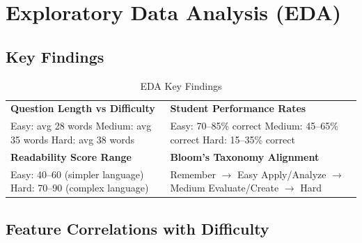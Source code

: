 \documentclass[12pt,a4paper]{article}
\begin{document}
\section{Exploratory Data Analysis (EDA)}

\subsection{Key Findings}

\begin{table}[H]
\centering
\begin{tabular}{|L{6cm}|L{6cm}|}
\hline
{}
 \\
\hline
\textcolor{nstlightblue}{\textbf{Question Length vs Difficulty}} &
\textcolor{nstlightblue}{\textbf{Student Performance Rates}} \\
Easy: avg 28 words \newline
Medium: avg 35 words \newline
Hard: avg 38 words &
Easy: 70--85\% correct \newline
Medium: 45--65\% correct \newline
Hard: 15--35\% correct \\
\hline
{}
\textcolor{nstlightblue}{\textbf{Readability Score Range}} &
\textcolor{nstlightblue}{\textbf{Bloom's Taxonomy Alignment}} \\
Easy: 40--60 (simpler language) \newline
Hard: 70--90 (complex language) &
Remember $\rightarrow$ Easy \newline
Apply/Analyze $\rightarrow$ Medium \newline
Evaluate/Create $\rightarrow$ Hard \\
\hline
\end{tabular}
\caption{EDA Key Findings}
\end{table}

\subsection{Feature Correlations with Difficulty}
\end{document}
